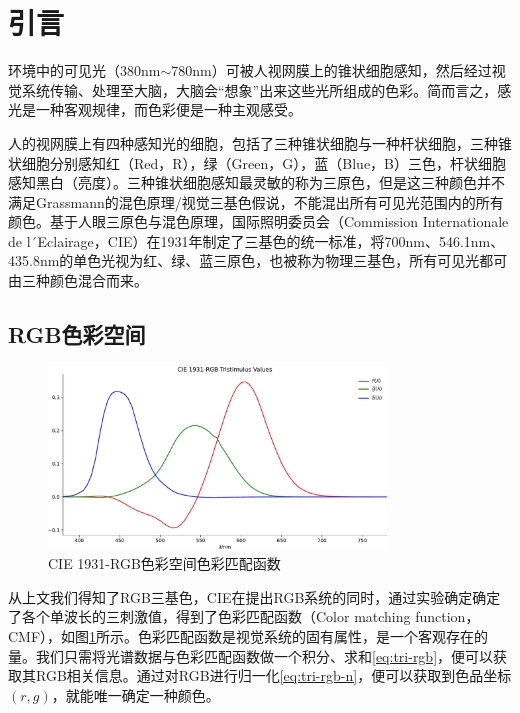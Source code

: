 \section{引言}

环境中的可见光（380nm$\sim$780nm）可被人视网膜上的锥状细胞感知，然后经过视觉系统传输、处理至大脑，大脑会``想象''出来这些光所组成的色彩。简而言之，感光是一种客观规律，而色彩便是一种主观感受。

人的视网膜上有四种感知光的细胞，包括了三种锥状细胞与一种杆状细胞，三种锥状细胞分别感知红（Red，R），绿（Green，G），蓝（Blue，B）三色，杆状细胞感知黑白（亮度）。三种锥状细胞感知最灵敏的称为三原色，但是这三种颜色并不满足Grassmann的混色原理/视觉三基色假说\cite{grassmann1853theorie}，不能混出所有可见光范围内的所有颜色。基于人眼三原色与混色原理，国际照明委员会（Commission Internationale de l´Eclairage，CIE）在1931年制定了三基色的统一标准，将700nm、546.1nm、435.8nm的单色光视为红、绿、蓝三原色，也被称为物理三基色，所有可见光都可由三种颜色混合而来。

\subsection{RGB色彩空间}

\begin{figure}[htbp]
    \centering
    \includegraphics[width=0.8\textwidth]{./imgs/sec1/rgb-1931.pdf}
    \caption{CIE 1931-RGB色彩空间色彩匹配函数}
    \label{fig:tri-rgb}
 \end{figure}

从上文我们得知了RGB三基色，CIE在提出RGB系统的同时，通过实验确定确定了各个单波长的三刺激值，得到了色彩匹配函数（Color matching function，CMF），如图\ref{fig:tri-rgb}所示。色彩匹配函数是视觉系统的固有属性，是一个客观存在的量。我们只需将光谱数据与色彩匹配函数做一个积分、求和\eqref{eq:tri-rgb}，便可以获取其RGB相关信息。通过对RGB进行归一化\eqref{eq:tri-rgb-n}，便可以获取到色品坐标$(r,g)$，就能唯一确定一种颜色。


